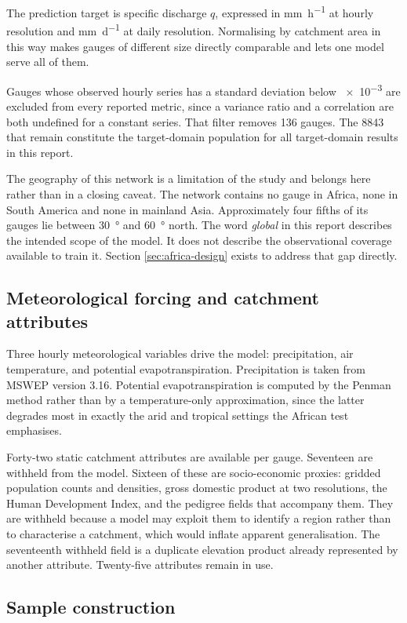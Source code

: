 \documentclass[11pt,a4paper]{article}
\begin{document}
The prediction target is specific discharge $q$, expressed in \si{\mm\per\hour} at hourly
resolution and \si{\mm\per\day} at daily resolution. Normalising by catchment area in this
way makes gauges of different size directly comparable and lets one model serve all of them.

Gauges whose observed hourly series has a standard deviation below \num{e-3} are excluded
from every reported metric, since a variance ratio and a correlation are both undefined for a
constant series. That filter removes \num{136} gauges. The \num{8843} that remain constitute
the target-domain population for all target-domain results in this report.

The geography of this network is a limitation of the study and belongs here rather than in a
closing caveat. The network contains no gauge in Africa, none in South America and none in
mainland Asia. Approximately four fifths of its gauges lie between \SI{30}{\degree} and
\SI{60}{\degree} north. The word \emph{global} in this report describes the intended scope of
the model. It does not describe the observational coverage available to train it. Section
\ref{sec:africa-design} exists to address that gap directly.

\subsection{Meteorological forcing and catchment attributes}

Three hourly meteorological variables drive the model: precipitation, air temperature, and
potential evapotranspiration. Precipitation is taken from MSWEP version 3.16. Potential
evapotranspiration is computed by the Penman method rather than by a temperature-only
approximation, since the latter degrades most in exactly the arid and tropical settings the
African test emphasises.

Forty-two static catchment attributes are available per gauge. Seventeen are withheld from
the model. Sixteen of these are socio-economic proxies: gridded population counts and
densities, gross domestic product at two resolutions, the Human Development Index, and the
pedigree fields that accompany them. They are withheld because a model may exploit them to
identify a region rather than to characterise a catchment, which would inflate apparent
generalisation. The seventeenth withheld field is a duplicate elevation product already
represented by another attribute. Twenty-five attributes remain in use.

\subsection{Sample construction}
\end{document}

